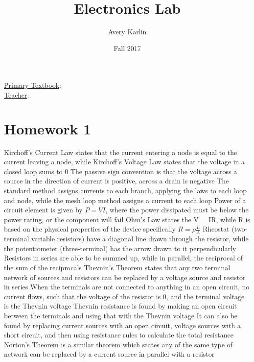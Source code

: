 \documentclass[11 pt, twoside]{article}
\newenvironment{outline*}
{
	\begin{outline}[enumerate]
	}
	{\end{outline}
}
\begin{document}
\title{Electronics Lab}
\author{Avery Karlin}
\date{Fall 2017}
\newcommand{\textbook}{}
\newcommand{\teacher}{}

\maketitle
\newpage
\hypertarget{content}{\tableofcontents}
\vspace{11pt}
\noindent
\underline{Primary Textbook}: \textbook\\
\underline{Teacher}: \teacher
\newpage

\section{Homework 1}
\begin{outline*}
\1 Kirchoff's Current Law states that the current entering a node is equal to the current leaving a node, while Kirchoff's Voltage Law states that the voltage in a closed loop sums to 0
	\2 The passive sign convention is that the voltage across a source in the direction of current is positive, across a drain is negative
	\2 The standard method assigns currents to each branch, applying the laws to each loop and node, while the mesh loop method assigns a current to each loop
\1 Power of a circuit element is given by $P = VI$, where the power dissipated must be below the power rating, or the component will fail
\1 Ohm's Law states the V = IR, while R is based on the physical properties of the device specifically $R = \rho \frac{L}{A}$
	\2 Rheostat (two-terminal variable resistors) have a diagonal line drawn through the resistor, while the potentiometer (three-terminal) has the arrow drawn to it perpendicularly
	\2 Resistors in series are able to be summed up, while in parallel, the reciprocal of the sum of the reciprocals
\1 Thevnin's Theorem states that any two terminal network of sources and resistors can be replaced by a voltage source and resistor in series
	\2 When the terminals are not connected to anything in an open circuit, no current flows, such that the voltage of the resistor is 0, and the terminal voltage is the Thevnin voltage
	\2 Thevnin resistance is found by making an open circuit between the terminals and using that with the Thevnin voltage
		\3 It can also be found by replacing current sources with an open circuit, voltage sources with a short circuit, and then using resistance rules to calculate the total resistance
	\2 Norton's Theorem is a similar theorem which states any of the same type of network can be replaced by a current source in parallel with a resistor

\end{outline*}
\end{document}
